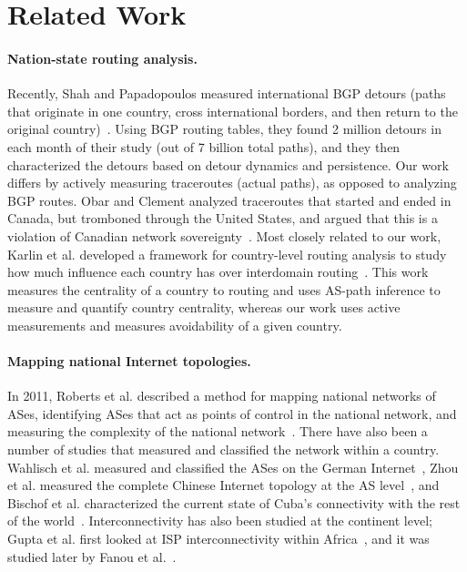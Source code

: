 \section{Related Work}
\label{related}

\paragraph{Nation-state routing analysis.}  Recently, Shah and
Papadopoulos measured international BGP detours (paths that originate in
one country, cross international borders, and then return to the
original country)~\cite{shah2015characterizing}.  Using BGP routing
tables, they found 2 million detours in each month of their study (out
of 7 billion total paths), and they then characterized the detours based
on detour dynamics and persistence.  Our work differs by actively
measuring traceroutes (actual paths), as opposed to analyzing BGP
routes.  Obar and Clement analyzed traceroutes
that started and ended in Canada, but tromboned through the United
States, and argued that
this is a violation of Canadian network
sovereignty~\cite{obar2012internet}.  Most closely related to our work,
Karlin et al. developed a framework for country-level
routing analysis to study how much influence each country has over
interdomain routing~\cite{karlin2009nation}.  This work measures the
centrality of a country to routing and uses AS-path inference to measure
and quantify country centrality, whereas our work uses active
measurements and measures avoidability of a given country. 

\paragraph{Mapping national Internet topologies.}  In 2011, Roberts et al. described
a method for mapping national networks of ASes, identifying ASes that
act as points of control in the national network, and measuring the
complexity of the national network~\cite{roberts2011mapping}.  There
have also been a number of studies that measured and classified the
network within a country.  Wahlisch et al. measured and classified the
ASes on the German Internet~\cite{wahlisch2010framework,
  wahlisch2012exposing}, Zhou et al. measured the complete
Chinese Internet topology at the AS level~\cite{zhou2007chinese}, and
Bischof et al. characterized the current state of Cuba's
connectivity with the rest of the world~\cite{bischof2015and}.
Interconnectivity has also been studied at the continent level; Gupta
et al. first looked at ISP interconnectivity within
Africa~\cite{gupta2014peering}, and it was studied later by Fanou et al.~\cite{fanou2015diversity}.

